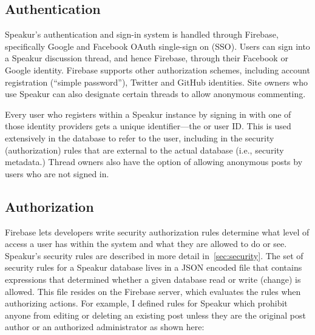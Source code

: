\subsection{Authentication}
Speakur's authentication and sign-in system is handled through Firebase, 
specifically Google and Facebook OAuth single-sign on (SSO).
Users can sign into a Speakur discussion thread, and hence Firebase, through their Facebook or Google identity.
Firebase supports other authorization schemes, including account registration (``simple password''), Twitter and GitHub identities.
Site owners who use Speakur can also designate certain threads to allow anonymous commenting.

Every user who registers within a Speakur instance by signing in with one of those identity providers gets a unique identifier---the  or user ID. 
This  is used extensively in the database to refer to the user, including in the security (authorization) rules that are external to the actual database (i.e., security metadata.) 
Thread owners also have the option of allowing anonymous posts by users who are not signed in.

\subsection{Authorization}
Firebase lets developers write security authorization rules determine what level of access a user has within the system and what they are allowed to do or see.
Speakur's security rules are described in more detail in~\cref{sec:security}.
The set of security rules for a Speakur database lives in a JSON encoded file that contains expressions that determined whether a given database read or write (change) is allowed. 
This file resides on the Firebase server, which evaluates the rules when authorizing actions.
For example, I defined rules for Speakur which prohibit anyone from editing or deleting an existing post unless they are the original post author or an authorized administrator as shown here:

